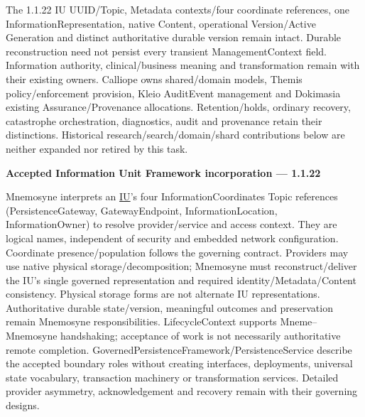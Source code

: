 The 1.1.22 IU UUID/Topic, Metadata contexts/four coordinate references, one InformationRepresentation, native Content, operational Version/Active Generation and distinct authoritative durable version remain intact. Durable reconstruction need not persist every transient ManagementContext field. Information authority, clinical/business meaning and transformation remain with their existing owners. Calliope owns shared/domain models, Themis policy/enforcement provision, Kleio AuditEvent management and Dokimasia existing Assurance/Provenance allocations. Retention/holds, ordinary recovery, catastrophe orchestration, diagnostics, audit and provenance retain their distinctions. Historical research/search/domain/shard contributions below are neither expanded nor retired by this task.



\par\medskip\textbf{Accepted Information Unit Framework incorporation — 1.1.22}\par


Mnemosyne interprets an \hyperref[element:74ec609de1ae498fbf9d13e4ef8c6cbe]{IU}'s four InformationCoordinates Topic references (PersistenceGateway, GatewayEndpoint, InformationLocation, InformationOwner) to resolve provider/service and access context. They are logical names, independent of security and embedded network configuration. Coordinate presence/population follows the governing contract. Providers may use native physical storage/decomposition; Mnemosyne must reconstruct/deliver the IU's single governed representation and required identity/Metadata/Content consistency. Physical storage forms are not alternate IU representations. Authoritative durable state/version, meaningful outcomes and preservation remain Mnemosyne responsibilities. LifecycleContext supports Mneme–Mnemosyne handshaking; acceptance of work is not necessarily authoritative remote completion. GovernedPersistenceFramework/PersistenceService describe the accepted boundary roles without creating interfaces, deployments, universal state vocabulary, transaction machinery or transformation services. Detailed provider asymmetry, acknowledgement and recovery remain with their governing designs.



